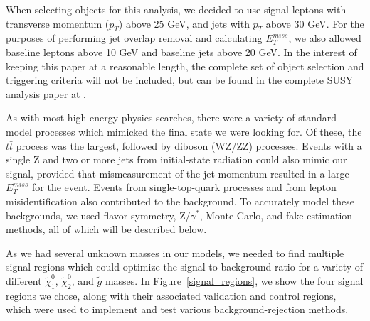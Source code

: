 When selecting objects for this analysis, we decided to use signal leptons with transverse momentum ($p_T$) above 25 GeV, and jets with $p_T$ above 30 GeV. For the purposes of performing jet overlap removal and calculating $E_T^{miss}$, we also allowed baseline leptons above 10 GeV and baseline jets above 20 GeV. In the interest of keeping this paper at a reasonable length, the complete set of object selection and triggering criteria will not be included, but can be found in the complete SUSY analysis paper at \cite{SUSY_2l2j}.

As with most high-energy physics searches, there were a variety of standard-model processes which mimicked the final state we were looking for. Of these, the $t\bar{t}$ process was the largest, followed by diboson (WZ/ZZ) processes. Events with a single Z and two or more jets from initial-state radiation could also mimic our signal, provided that mismeasurement of the jet momentum resulted in a large $E_T^{miss}$ for the event. Events from single-top-quark processes and from lepton misidentification also contributed to the background. To accurately model these backgrounds, we used flavor-symmetry, Z/$\gamma^*$, Monte Carlo, and fake estimation methods, all of which will be described below.

As we had several unknown masses in our models, we needed to find multiple signal regions which could optimize the signal-to-background ratio for a variety of different $\tilde{\chi}^0_1$, $\tilde{\chi}^0_2$, and $\tilde{g}$ masses. In Figure~\ref{signal_regions}, we show the four signal regions we chose, along with their associated validation and control regions, which were used to implement and test various background-rejection methods.